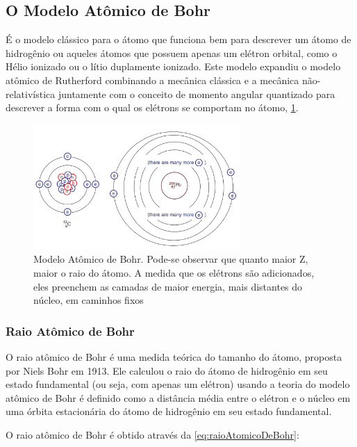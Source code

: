 \documentclass[11pt,a4paper]{article}
\begin{document}
\subsection*{O Modelo Atômico de Bohr}

    É o modelo clássico para o átomo que funciona bem para descrever um átomo de hidrogênio ou aqueles átomos que possuem apenas um elétron orbital, como o Hélio ionizado ou o lítio duplamente ionizado. Este modelo expandiu o modelo atômico de Rutherford combinando a mecânica clássica e a mecânica não-relativística juntamente com o conceito de momento angular quantizado para descrever a forma com o qual os elétrons se comportam no átomo, \ref{fig:modeloAtomicoDeBohr}.

    \begin{figure}[h]
		\centering
		\includegraphics[width=0.7\textwidth]{Imagens/modeloAtomicoDeBohr.jpg}
		\caption{Modelo Atômico de Bohr. Pode-se observar que quanto maior Z, maior o raio do átomo. A medida que os elétrons são adicionados, eles preenchem as camadas de maior energia, mais distantes do núcleo, em caminhos fixos}
		\label{fig:modeloAtomicoDeBohr}
	\end{figure}            

\subsubsection*{Raio Atômico de Bohr}

    O raio atômico de Bohr é uma medida teórica do tamanho do átomo, proposta por Niels Bohr em 1913. Ele calculou o raio do átomo de hidrogênio em seu estado fundamental (ou seja, com apenas um elétron) usando a teoria do modelo atômico de Bohr é definido como a distância média entre o elétron e o núcleo em uma órbita estacionária do átomo de hidrogênio em seu estado fundamental. 

    O raio atômico de Bohr é obtido através da  \ref{eq:raioAtomicoDeBohr}:
\end{document}
